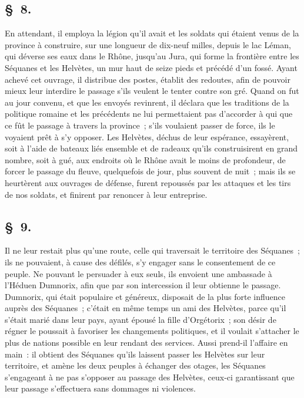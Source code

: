 \documentclass[french,twoside]{book} %
\begin{document}
\subsection[{§ 8.}]{ \textsc{§ 8.} }
\noindent En attendant, il employa la légion qu’il avait et les soldats qui étaient venus de la province à construire, sur une longueur de dix-neuf milles, depuis le lac Léman, qui déverse ses eaux dans le Rhône, jusqu’au Jura, qui forme la frontière entre les Séquanes et les Helvètes, un mur haut de seize pieds et précédé d’un fossé. Ayant achevé cet ouvrage, il distribue des postes, établit des redoutes, afin de pouvoir mieux leur interdire le passage s’ils veulent le tenter contre son gré. Quand on fut au jour convenu, et que les envoyés revinrent, il déclara que les traditions de la politique romaine et les précédents ne lui permettaient pas d’accorder à qui que ce fût le passage à travers la province ; s’ils voulaient passer de force, ils le voyaient prêt à s’y opposer. Les Helvètes, déchus de leur espérance, essayèrent, soit à l’aide de bateaux liés ensemble et de radeaux qu’ils construisirent en grand nombre, soit à gué, aux endroits où le Rhône avait le moins de profondeur, de forcer le passage du fleuve, quelquefois de jour, plus souvent de nuit ; mais ils se heurtèrent aux ouvrages de défense, furent repoussés par les attaques et les tirs de nos soldats, et finirent par renoncer à leur entreprise.
\subsection[{§ 9.}]{ \textsc{§ 9.} }
\noindent Il ne leur restait plus qu’une route, celle qui traversait le territoire des Séquanes ; ils ne pouvaient, à cause des défilés, s’y engager sans le consentement de ce peuple. Ne pouvant le persuader à eux seuls, ils envoient une ambassade à l’Héduen Dumnorix, afin que par son intercession il leur obtienne le passage. Dumnorix, qui était populaire et généreux, disposait de la plus forte influence auprès des Séquanes ; c’était en même temps un ami des Helvètes, parce qu’il s’était marié dans leur pays, ayant épousé la fille d’Orgétorix ; son désir de régner le poussait à favoriser les changements politiques, et il voulait s’attacher le plus de nations possible en leur rendant des services. Aussi prend-il l’affaire en main : il obtient des Séquanes qu’ils laissent passer les Helvètes sur leur territoire, et amène les deux peuples à échanger des otages, les Séquanes s’engageant à ne pas s’opposer au passage des Helvètes, ceux-ci garantissant que leur passage s’effectuera sans dommages ni violences.
\end{document}
